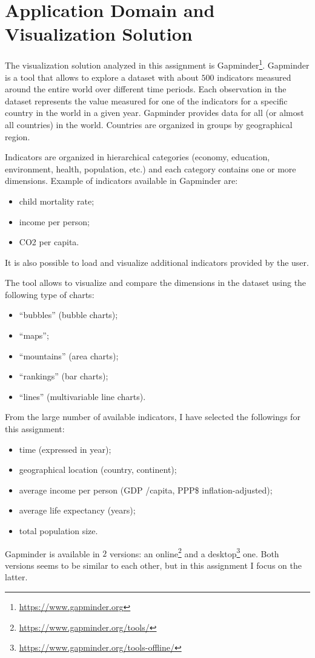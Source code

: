 \section{Application Domain and Visualization Solution}
\label{sec:visualization_solution}

The visualization solution analyzed in this assignment is Gapminder\footnote{\url{https://www.gapminder.org}}.
Gapminder is a tool that allows to explore a dataset with about $500$ indicators measured around the entire world over different time periods.
Each observation in the dataset represents the value measured for one of the indicators for a specific country in the world in a given year.
Gapminder provides data for all (or almost all countries) in the world.
Countries are organized in groups by geographical region.

Indicators are organized in hierarchical categories (economy, education, environment, health, population, etc.) and each category contains one or more dimensions.
Example of indicators available in Gapminder are:
\begin{itemize}
    \item child mortality rate;
    \item income per person;
    \item CO2 per capita.
\end{itemize}
It is also possible to load and visualize additional indicators provided by the user.

The tool allows to visualize and compare the dimensions in the dataset using the following type of charts:
\begin{itemize}
    \item ``bubbles'' (bubble charts);
    \item ``maps'';
    \item ``mountains'' (area charts);
    \item ``rankings'' (bar charts);
    \item ``lines'' (multivariable line charts).
\end{itemize}

\vspace{3mm}

From the large number of available indicators, I have selected the followings for this assignment:
\begin{itemize}
    \item time (expressed in year);
    \item geographical location (country, continent);
    \item average income per person (GDP /capita, PPP\$ inflation-adjusted);
    \item average life expectancy (years);
    \item total population size.
\end{itemize}

Gapminder is available in $2$ versions: an online\footnote{\url{https://www.gapminder.org/tools/}} and a desktop\footnote{\url{https://www.gapminder.org/tools-offline/}} one.
Both versions seems to be similar to each other, but in this assignment I focus on the latter.

